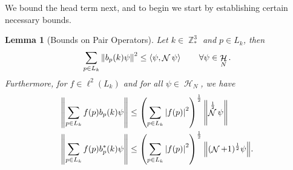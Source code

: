 \documentclass[sn-mathphys, Numbered ,a4paper]{sn-jnl}%
\DeclareMathOperator{\Z}{\mathbb{Z}}
\DeclareMathOperator{\HH}{\mathcal{H}}
\DeclareMathOperator{\NN}{\mathcal{N}}
\newcommand{\half}{\frac{1}{2}}
\newcommand{\eva}[1]{\left\langle #1 \right\rangle}
\theoremstyle{plain}
\newtheorem{lemma}[theorem]{Lemma}
\theoremstyle{definition}
\theoremstyle{remark}
\theoremstyle{plain}
\theoremstyle{definition}
\theoremstyle{remark}
\begin{document}
We bound the head term next, and to begin we start by establishing certain necessary bounds.    
\begin{lemma}[Bounds on Pair Operators]\label{lem:pairest}
    Let $k \in \Z^3_*$ and $p \in L_k$, then
    \begin{equation}\label{eq:estopb}
        \sum\limits_{p \in L_k}\norm{b_p(k)\psi}^2 \leq  \eva{\psi, \NN\psi} \quad \quad \forall \psi \in \HH_N .
    \end{equation}
    Furthermore, for $f \in \ell^2(L_k)$ and for all $\psi \in \HH_N$, we have
    \begin{align}
        \norm{\sum\limits_{p\in L_k}f(p)b_p(k)\psi}&\leq \left(\sum\limits_{p \in L_{k}}\left|f(p)\right|^2\right)^\half \norm{\NN^\half\psi}\label{eq:estb}\\
        \norm{\sum\limits_{p\in L_k}f(p)b^*_p(k)\psi}&\leq \left(\sum\limits_{p \in L_{k}}\left|f(p)\right|^2\right)^\half \norm{(\NN+1)^\half\psi}.\label{eq:estb*}
    \end{align}
\end{lemma}
\end{document}
